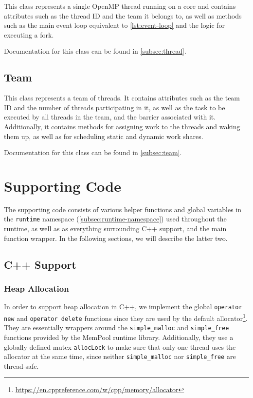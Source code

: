 This class represents a single OpenMP thread running on a core and contains attributes such as the
thread ID and the team it belongs to, as well as methods such as the main event loop equivalent to
\cref{lst:event-loop} and the logic for executing a fork.

Documentation for this class can be found in \cref{subsec:thread}.

\subsection{Team}

This class represents a team of threads. It contains attributes such as the team ID and the number
of threads participating in it, as well as the task to be executed by all threads in the team, and
the barrier associated with it. Additionally, it contains methods for assigning work to the threads
and waking them up, as well as for scheduling static and dynamic work shares.

Documentation for this class can be found in \cref{subsec:team}.

\section{Supporting Code}

The supporting code consists of various helper functions and global variables in the
\texttt{runtime} namespace (\cref{subsec:runtime-namespace}) used throughout the runtime, as well as
as everything surrounding C++ support, and the main function wrapper. In the following sections, we
will describe the latter two.

\subsection{C++ Support}

\subsubsection{Heap Allocation}

In order to support heap allocation in C++, we implement the global \texttt{operator new} and
\texttt{operator delete} functions since they are used by the default
allocator\footnote{\url{https://en.cppreference.com/w/cpp/memory/allocator}}. They are essentially
wrappers around the \texttt{simple\_malloc} and \texttt{simple\_free} functions provided by the
MemPool runtime library. Additionally, they use a globally defined mutex \texttt{allocLock} to make
sure that only one thread uses the allocator at the same time, since neither \texttt{simple\_malloc}
nor \texttt{simple\_free} are thread-safe.

